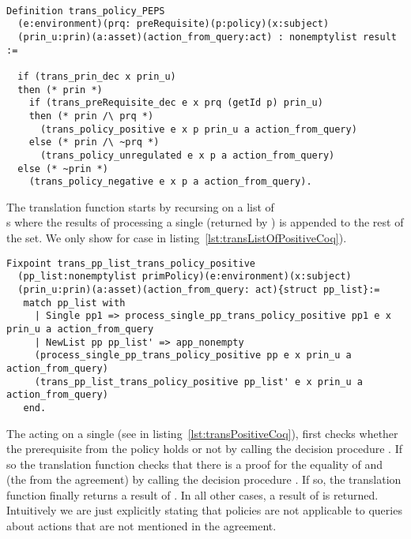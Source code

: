 \begin{lstlisting}

Definition trans_policy_PEPS
  (e:environment)(prq: preRequisite)(p:policy)(x:subject)
  (prin_u:prin)(a:asset)(action_from_query:act) : nonemptylist result :=
  
  if (trans_prin_dec x prin_u)
  then (* prin *)
    if (trans_preRequisite_dec e x prq (getId p) prin_u)
    then (* prin /\ prq *)
      (trans_policy_positive e x p prin_u a action_from_query)
    else (* prin /\ ~prq *)
      (trans_policy_unregulated e x p a action_from_query)
  else (* ~prin *)
    (trans_policy_negative e x p a action_from_query).

\end{lstlisting}


The  translation function starts by recursing on a list of \\ s where the results of processing a single  (returned by ) is appended to the rest of the set. We only show  for  case in listing~\ref{lst:transListOfPositiveCoq}). 


\begin{lstlisting}
Fixpoint trans_pp_list_trans_policy_positive
  (pp_list:nonemptylist primPolicy)(e:environment)(x:subject)
  (prin_u:prin)(a:asset)(action_from_query: act){struct pp_list}:=
   match pp_list with
     | Single pp1 => process_single_pp_trans_policy_positive pp1 e x prin_u a action_from_query
     | NewList pp pp_list' => app_nonempty
	 (process_single_pp_trans_policy_positive pp e x prin_u a action_from_query) 
	 (trans_pp_list_trans_policy_positive pp_list' e x prin_u a action_from_query)
   end.
\end{lstlisting}


The  acting on a single  (see  in listing~\ref{lst:transPositiveCoq}), first checks whether the prerequisite from the policy holds or not by calling the decision procedure . If so the translation function checks that there is a proof for the equality of  and  (the  from the agreement) by calling the decision procedure . If so, the translation function finally returns a result of . In all other cases, a result of  is returned. Intuitively we are just explicitly stating that policies are not applicable to queries about actions that are not mentioned in the agreement. 

